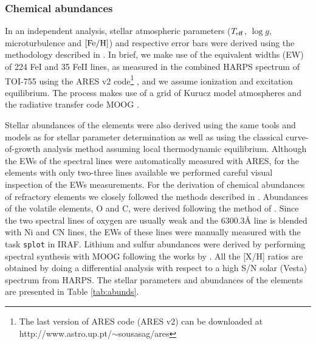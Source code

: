 \documentclass[fleqn,usenatbib]{mnras}
\newcommand{\teff}{$T_{\rm eff}$}
\newcommand{\feh}{\mbox{$\rm [Fe/H]$}}
\newcommand{\logg}{$\log g$}
\begin{document}
\subsubsection{Chemical abundances} \label{sec:parameters}
In an independent analysis, stellar atmospheric parameters (\teff{}, \logg{}, microturbulence and \feh{}) and respective error bars were derived using the methodology described in \citet{Sousa-14, Santos-13}. In brief, we make use of the equivalent widths (EW) of 224 FeI and 35 FeII lines, as measured in the combined HARPS spectrum of TOI-755 using the ARES v2 code\footnote{The last version of ARES code (ARES v2) can be downloaded at http://www.astro.up.pt/$\sim$sousasag/ares} \citep{Sousa-15}, and we assume ionization and excitation equilibrium. The process makes use of a grid of Kurucz model atmospheres \citep{Kurucz-93} and the radiative transfer code MOOG \citep{Sneden-73}.

Stellar abundances of the elements were also derived using the same tools and models as for stellar parameter determination as well as using the classical curve-of-growth analysis method assuming local thermodynamic equilibrium. Although the EWs of the spectral lines were automatically measured with ARES, for the elements with only two-three lines available we performed careful visual inspection of the EWs measurements. For the derivation of chemical abundances of refractory elements we closely followed the methods described in \citep[e.g.][]{Adibekyan-12, Adibekyan-15, Delgado-14, Delgado-17}. Abundances of the volatile elements, O and C, were derived following the method of \cite{Delgado-10, Bertrandelis-15}. Since the two spectral lines of oxygen are usually weak and the 6300.3\AA{} line is blended with Ni and CN lines, the EWs of these lines were manually measured with the task \texttt{splot} in IRAF. Lithium and sulfur abundances were derived by performing spectral synthesis with MOOG following the works by \citet[][,respectively]{Delgado-14,Costa_Silva2020}. All the [X/H] ratios are obtained by doing a differential analysis with respect to a high S/N solar (Vesta) spectrum from HARPS. The stellar parameters and abundances of the elements are presented in Table \ref{tab:abunds}. 
\end{document}
